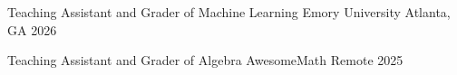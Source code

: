 
\begin{cvhonors}

\cvhonor
{Teaching Assistant and Grader of Machine Learning}
{Emory University}
{Atlanta, GA}
{2026}

\cvhonor
{Teaching Assistant and Grader of Algebra}
{AwesomeMath}
{Remote}
{2025}

\end{cvhonors}
